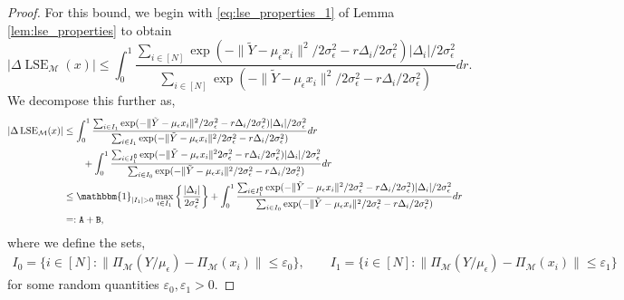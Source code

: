 \documentclass[10pt,a4paper]{amsart}
\newcommand{\M}{{\mathcal{M}}}
\newcommand{\lse}{\operatorname{LSE}}
\begin{document}
\begin{proof}
For this bound, we begin with \eqref{eq:lse_properties_1} of Lemma \ref{lem:lse_properties} to obtain
\begin{equation*}
    | \Delta \lse_\M(x) | \leq \int_0^1 \frac{\sum_{i \in [N]} \exp(-\|\tilde{Y} - \mu_\epsilon x_i\|^2/2\sigma_\epsilon^2-r\Delta_i/2\sigma_\epsilon^2) |\Delta_i|/2\sigma_\epsilon^2}{\sum_{i \in [N]} \exp(-\|\tilde{Y} - \mu_\epsilon x_i\|^2/2\sigma_\epsilon^2-r\Delta_i/2\sigma_\epsilon^2)} dr.
\end{equation*}
We decompose this further as,
\begin{align*}
    | \Delta \lse_\M(x) | &\leq \int_0^1 \frac{\sum_{i \in I_1} \exp(-\|\tilde{Y} - \mu_\epsilon x_i\|^2/2\sigma_\epsilon^2-r\Delta_i/2\sigma_\epsilon^2) |\Delta_i|/2\sigma_\epsilon^2}{\sum_{i \in I_1} \exp(-\|\tilde{Y} - \mu_\epsilon x_i\|^2/2\sigma_\epsilon^2-r\Delta_i/2\sigma_\epsilon^2)} dr\\
    & \qquad + \int_0^1 \frac{\sum_{i \in I_1^\complement} \exp(-\|\tilde{Y} - \mu_\epsilon x_i\|^22\sigma_\epsilon^2-r\Delta_i/2\sigma_\epsilon^2) |\Delta_i|/2\sigma_\epsilon^2}{\sum_{i \in I_0} \exp(-\|\tilde{Y} - \mu_\epsilon x_i\|^2/2\sigma_\epsilon^2-r\Delta_i/2\sigma_\epsilon^2)} dr \\
    &\leq \mathbbm{1}_{|I_1| > 0} \max_{i \in I_{1}} \bigg \{ \frac{|\Delta_i|}{2\sigma_\epsilon^2} \bigg \} + \int_0^1 \frac{\sum_{i \in I_{1}^\complement} \exp(-\|\tilde{Y} - \mu_\epsilon x_i\|^2/2\sigma_\epsilon^2-r\Delta_i/2\sigma_\epsilon^2) |\Delta_i|/2\sigma_\epsilon^2}{\sum_{i \in I_0} \exp(-\|\tilde{Y} - \mu_\epsilon x_i\|^2/2\sigma_\epsilon^2-r\Delta_i/2\sigma_\epsilon^2)} dr \\
    &=: \mathtt{A} + \mathtt{B},
\end{align*}
where we define the sets,
\begin{gather*}
    I_0 = \{i \in [N]: \|\Pi_\M(Y/\mu_\epsilon) - \Pi_\M(x_i)\| \leq \varepsilon_0\}, \qquad I_1 = \{i \in [N]: \|\Pi_\M(Y/\mu_\epsilon) - \Pi_\M(x_i)\| \leq \varepsilon_1\}
\end{gather*}
for some random quantities \(\varepsilon_0, \varepsilon_1 > 0\).


\end{proof}
\end{document}

